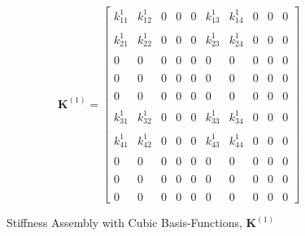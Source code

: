 \begin{figure}
	\centering
	\begin{equation*}
		\mathbf{K}^{\left( 1 \right)} =
		\begin{bmatrix}
			k_{11}^{1} & k_{12}^{1} & 0 & 0 & 0 & k_{13}^{1} & k_{14}^{1} & 0 & 0 & 0 \\ \\
			k_{21}^{1} & k_{22}^{1} & 0 & 0 & 0 & k_{23}^{1} & k_{24}^{1} & 0 & 0 & 0 \\ \\
			0 & 0 & 0 & 0 & 0 & 0 & 0 & 0 & 0 & 0 \\ \\
			0 & 0 & 0 & 0 & 0 & 0 & 0 & 0 & 0 & 0 \\ \\
			0 & 0 & 0 & 0 & 0 & 0 & 0 & 0 & 0 & 0 \\ \\
			k_{31}^{1} & k_{32}^{1} & 0 & 0 & 0 & k_{33}^{1} & k_{34}^{1} & 0 & 0 & 0 \\ \\
			k_{41}^{1} & k_{42}^{1} & 0 & 0 & 0 & k_{43}^{1} & k_{44}^{1} & 0 & 0 & 0 \\ \\
			0 & 0 & 0 & 0 & 0 & 0 & 0 & 0 & 0 & 0 \\ \\
			0 & 0 & 0 & 0 & 0 & 0 & 0 & 0 & 0 & 0 \\ \\
			0 & 0 & 0 & 0 & 0 & 0 & 0 & 0 & 0 & 0
			\end{bmatrix}
	\end{equation*}
	\caption{Stiffness Assembly with Cubic Basis-Functions, $\mathbf{K}^{\left( 1 \right)}$}
	\label{fig:K_1_Cubic}	
\end{figure}
%
